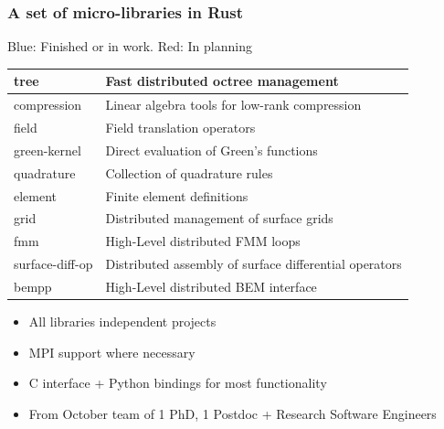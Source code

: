 \documentclass[dvipsnames,10pt]{beamer}
\begin{document}
\begin{frame}
\frametitle{A set of micro-libraries in Rust}

	
	{Blue}: Finished or in work. {Red}: In planning
	
	{\small
	\begin{center}
	
	\begin{tabular}{|l|l|}
	\hline
	{\color{blue}tree} & Fast distributed octree management\\
	\hline
	{\color{blue}compression} & Linear algebra tools for low-rank compression\\
	\hline
	{\color{red}field} & Field translation operators\\
	\hline
	{\color{blue}green-kernel} & Direct evaluation of Green's functions\\
	\hline
	{\color{blue}quadrature} & Collection of quadrature rules\\
	\hline
	{\color{blue}element} & Finite element definitions\\
	\hline
	{\color{red}grid} & Distributed management of surface grids\\
	\hline
	{\color{red}fmm} & High-Level distributed FMM loops\\
	\hline
	{\color{red}surface-diff-op} & Distributed assembly of surface differential operators\\
	\hline
	{\color{red}bempp} & High-Level distributed BEM interface\\
	\hline
	
	\end{tabular}
	
		
	\end{center}
	}
	\begin{itemize}
	\item All libraries independent projects
	\item MPI support where necessary
	\item C interface + Python bindings for most functionality
	\item From October team of 1 PhD, 1 Postdoc + Research Software Engineers
	
	\end{itemize}
	
\end{frame}
\end{document}
